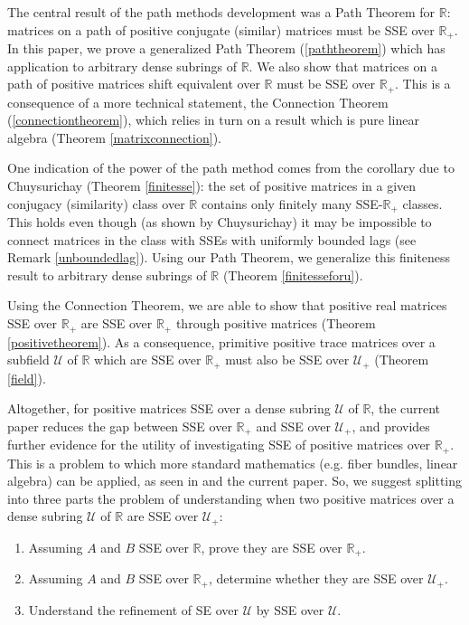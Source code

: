 \documentclass{amsart}
\theoremstyle{definition}
\theoremstyle{remark}
\numberwithin{equation}{section}
\begin{document}
The central result of the path 
methods development was a Path Theorem for $\mathbb R$:
  matrices on a path of positive 
conjugate (similar) matrices must be SSE over $\mathbb R_+$. 
In this paper, we prove a generalized Path Theorem (\ref{paththeorem}) 
which has application to arbitrary dense subrings of $\mathbb R$.
We also show   that  matrices on a path of positive  matrices shift 
equivalent over 
$\mathbb R$ must be SSE over $\mathbb R_+$. 
This is a consequence of a more technical statement, the 
Connection Theorem (\ref{connectiontheorem}), which relies 
in turn  on a result which 
is pure linear algebra (Theorem \ref{matrixconnection}). 

One indication of the power of the path method 
comes from the corollary  due to 
 Chuysurichay (Theorem \ref{finitesse}): the set of positive matrices 
in a given  conjugacy (similarity) 
class over $\mathbb R$  contains only finitely many 
SSE-$\mathbb R_+$ classes. 
This holds even though 
(as shown by  Chuysurichay) 
it may be impossible 
to connect matrices in the class with SSEs with 
uniformly bounded lags  
(see Remark 
\ref{unboundedlag}).
Using our Path Theorem, we generalize this finiteness result 
 to arbitrary dense 
subrings of $\mathbb R$ (Theorem \ref{finitesseforu}). 

Using  the Connection Theorem, we are able to show that 
positive real matrices SSE over $\mathbb R_+$ are SSE 
 over $\mathbb R_+$ through positive matrices (Theorem 
\ref{positivetheorem}).  
As a consequence, 
primitive positive trace matrices 
over  a subfield  $\mathcal U$ of  $\mathbb R$
which 
are SSE over 
 $\mathbb R_+$ must also be  SSE over 
 $\mathcal U_+$ (Theorem  \ref{field}). 

Altogether,  for positive matrices SSE over a dense subring 
$\mathcal U$ of $\mathbb R$, 
 the current paper reduces the gap between 
 SSE over $\mathbb R_+$ and 
 SSE over $\mathcal U_+$, and provides further evidence 
for the utility of investigating SSE 
of positive matrices over $\mathbb R_+$. 
This is a problem to which more standard mathematics 
(e.g. fiber bundles, linear algebra) can be applied, 
as seen in \cite{KR1,KR2,KR3,KR4,KR5} and the current paper.
So, we suggest splitting into three parts 
the problem of understanding when two positive matrices 
over a dense subring $\mathcal U$ 
of $\mathbb R$ are SSE over $\mathcal U_+$: 
\begin{enumerate} 
\item 
Assuming $A$ and $B$  SSE over $\mathbb R$, 
prove they are SSE over $\mathbb R_+$. 
\item 
Assuming $A$ and $B$ SSE over $\mathbb R_+$, 
determine whether they are SSE over $\mathcal U_+$. 
\item 
Understand the refinement of SE over $\mathcal U$ 
by SSE over $\mathcal U$. 
\end{enumerate} 
\end{document}
